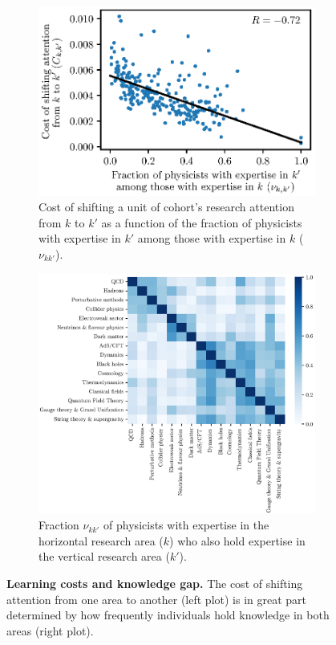 \documentclass{article}
\begin{document}
\begin{figure}[H]
\begin{subfigure}{.45\textwidth}
    \centering
    \includegraphics[width=1.15\textwidth]{plots/Fig14a.eps}
    \caption{Cost of shifting a unit of cohort's research attention from $k$ to $k'$ as a function of the fraction of physicists with expertise in $k'$ among those with expertise in $k$ ($\nu_{kk'}$).}
    \label{fig:cost_knowledge}
\end{subfigure}\hfill%
\begin{subfigure}{0.45\textwidth}
    \centering
    \includegraphics[width=1.15\textwidth]{plots/Fig14b.eps}
    \caption{Fraction $\nu_{kk'}$ of physicists with expertise in the horizontal research area ($k$) who also hold expertise in the vertical research area ($k'$).}
    \label{fig:nu}
\end{subfigure}
\caption{\textbf{Learning costs and knowledge gap.} The cost of shifting attention from one area to another (left plot) is in great part determined by how frequently individuals hold knowledge in both areas (right plot).}
\label{fig:knowledge}
\end{figure}
\end{document}
